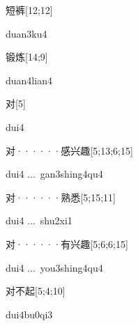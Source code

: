 \begin{verbete}[duan3ku4]{短裤}[12;12]
\begin{pronuncia}{duan3ku4}
\end{pronuncia}
\end{verbete}

\begin{verbete}{锻炼}[14;9]
\begin{pronuncia}{duan4lian4}
\end{pronuncia}
\end{verbete}

\begin{verbete}[dui4]{对}[5]
\begin{pronuncia}{dui4}
\end{pronuncia}
\end{verbete}

\begin{verbete}{对······感兴趣}[5;13;6;15]
\begin{pronuncia}[\\]{dui4 ...\  gan3shing4qu4}
\end{pronuncia}
\end{verbete}

\begin{verbete}{对······熟悉}[5;15;11]
\begin{pronuncia}[\\]{dui4 ...\  shu2xi1}
\end{pronuncia}
\end{verbete}

\begin{verbete}{对······有兴趣}[5;6;6;15]
\begin{pronuncia}[\\]{dui4 ...\  you3shing4qu4}
\end{pronuncia}
\end{verbete}

\begin{verbete}[dui4bu0qi3]{对不起}[5;4;10]
\begin{pronuncia}{dui4bu0qi3}
\end{pronuncia}
\end{verbete}

